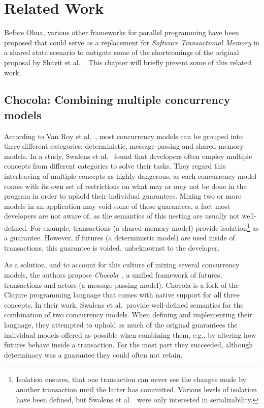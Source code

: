 %
\chapter{Related Work}%
\label{sec:related}

Before Ohua, various other frameworks for parallel programming have been proposed that could serve as a replacement for \emph{Software Transactional Memory} in a shared state scenario to mitigate some of the shortcomings of the original proposal by Shavit et al.~\cite{shavit1997software}.
This chapter will briefly present some of this related work.

\section{Chocola: Combining multiple concurrency models}%
\label{sec:related:chocola}
According to Van Roy et al.~\cite{van2004concepts}, most concurrency models can be grouped into three different categories: deterministic, message-passing and shared memory models.
In a study, Swalens et al.~\cite{swalens2018chocola} found that developers often employ multiple concepts from different categories to solve their tasks.
They regard this interleaving of multiple concepts as highly dangerous, as each concurrency model comes with its own set of restrictions on what may or may not be done in the program in order to uphold their individual guarantees.
Mixing two or more models in an application may void some of these guarantees, a fact most developers are not aware of, as the semantics of this nesting are usually not well-defined.
For example, transactions (a shared-memory model) provide isolation\footnote{Isolation ensures, that one transaction can never see the changes made by another transaction until the latter has committed. Various levels of isolation have been defined, but Swalens et al.~\cite{swalens2018chocola} were only interested in serializability.} as a guarantee.
However, if futures (a deterministic model) are used inside of transactions, this guarantee is voided, unbeknownst to the developer.

As a solution, and to account for this culture of mixing several concurrency models, the authors propose \emph{Chocola}~\cite{swalens2018chocola}, a unified framework of futures, transactions and actors (a message-passing model).
Chocola is a fork of the Clojure programming language that comes with native support for all three concepts.
In their work, Swalens et al.\ provide well-defined semantics for the combination of two concurrency models.
When defining and implementing their language, they attempted to uphold as much of the original guarantees the individual models offered as possible when combining them, e.g., by altering how futures behave inside a transaction.
For the most part they succeeded, although determinacy was a guarantee they could often not retain.

